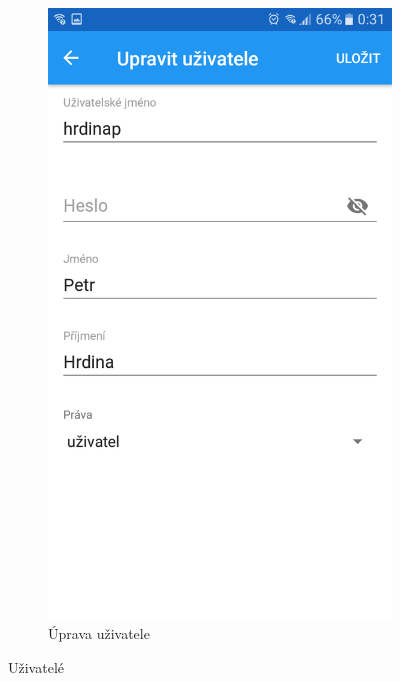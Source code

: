 \documentclass[czech,BP]{thesiskiv}
\begin{document}
\begin{figure}[H]
\begin{subfigure}[b]{0.3\textwidth}
	\includegraphics[width=\textwidth]{../images/client_android/Screenshot_20170612-003127.png}	
	\caption{Úprava uživatele}
	\label{fig:Screenshot_20170612-003127}
  \end{subfigure}
  \caption{Uživatelé}
\end{figure}
\end{document}
